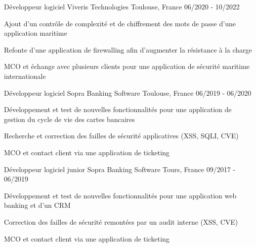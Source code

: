 

\begin{cventries}

  \cventry
    {Développeur logiciel} %
    {Viveris Technologies} %
    {Toulouse, France} %
    {06/2020 - 10/2022} %
    {
      \begin{cvitems} %
        \item {Ajout d'un contrôle de complexité et de chiffrement des mots de passe d'une application maritime}
        \item {Refonte d'une application de firewalling afin d'augmenter la résistance à la charge}
        \item {MCO et échange avec plusieurs clients pour une application de sécurité maritime internationale}
      \end{cvitems}
    }

  \cventry
    {Développeur logiciel} %
    {Sopra Banking Software} %
    {Toulouse, France} %
    {06/2019 - 06/2020} %
    {
      \begin{cvitems} %
        \item {Développement et test de nouvelles fonctionnalités pour une application de gestion du cycle de vie des cartes bancaires}
        \item {Recherche et correction des failles de sécurité applicatives (XSS, SQLI, CVE)}
        \item {MCO et contact client via une application de ticketing}
      \end{cvitems}
    }

  \cventry
    {Développeur logiciel junior} %
    {Sopra Banking Software} %
    {Tours, France} %
    {09/2017 - 06/2019} %
    {
      \begin{cvitems} %
        \item {Développement et test de nouvelles fonctionnalités pour une application web banking et d'un CRM}
        \item {Correction des failles de sécurité remontées par un audit interne (XSS, CVE)}
        \item {MCO et contact client via une application de ticketing}
      \end{cvitems}
    }


\end{cventries}
